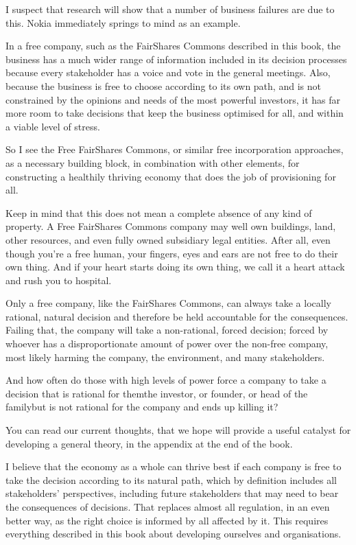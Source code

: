 I suspect that research will show that a number of business failures are due to this. Nokia immediately springs to mind as an example.






In a free company, such as the FairShares Commons  described in this book, the business has a much wider range of information included in its decision processes because every stakeholder has a voice and vote in the general meetings. Also, because the business is free to choose according to its own path, and is not constrained by the opinions and needs of the most powerful investors, it has far more room to take decisions that keep the business optimised for all, and within a viable level of stress.


So I see the Free FairShares Commons, or similar free incorporation approaches, as a necessary building block, in combination with other elements, for constructing a healthily thriving economy that does the job of provisioning for all.


Keep in mind that this does not mean a complete absence of any kind of property. A Free FairShares Commons company may well own buildings, land, other resources, and even fully owned subsidiary legal entities. After all, even though you’re a free human, your fingers, eyes and ears are not free to do their own thing. And if your heart starts doing its own thing, we call it a heart attack and rush you to hospital.


Only a free company, like the FairShares Commons, can always take a locally rational, natural decision and therefore be held accountable for the consequences. Failing that, the company will take a non-rational, forced decision; forced by whoever has a disproportionate amount of power over the non-free company, most likely harming the company, the environment, and many stakeholders. 


And how often do those with high levels of power force a company to take a decision that is rational for them\textemdash the investor, or founder, or head of the family\textemdash but is not rational for the company and ends up killing it?


You can read our current thoughts, that we hope will provide a useful catalyst for developing a general theory, in the appendix at the end of the book.


I believe that the economy as a whole can thrive best if each company is free to take the decision according to its natural path, which by definition includes all stakeholders’ perspectives, including future stakeholders that may need to bear the consequences of decisions. That replaces almost all regulation, in an even better way, as the right choice is informed by all affected by it. This requires everything described in this book about developing ourselves and organisations.